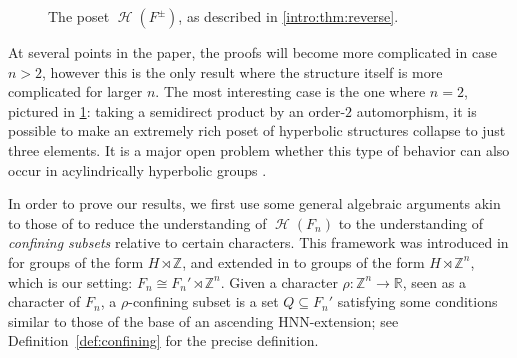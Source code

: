 \documentclass[reqno,12pt]{amsart}\setcounter{tocdepth}{1}
\theoremstyle{definition}
\newcommand{\Z}{\mathbb{Z}}
\newcommand{\R}{\mathbb{R}}
\DeclareMathOperator{\Hyp}{\mathcal{H}}
\numberwithin{equation}{section}
\begin{document}
\begin{figure}[htb]
\centering
{}

\caption{The poset $\Hyp(F^{\pm})$, as described in \cref{intro:thm:reverse}.}
\label{intro:fig:reverse}
\end{figure}

At several points in the paper, the proofs will become more complicated in case $n > 2$, however this is the only result where the structure itself is more complicated for larger $n$. The most interesting case is the one where $n = 2$, pictured in \cref{intro:fig:reverse}: taking a semidirect product by an order-$2$ automorphism, it is possible to make an extremely rich poset of hyperbolic structures collapse to just three elements. It is a major open problem whether this type of behavior can also occur in acylindrically hyperbolic groups \cite[Question 2]{erratum}.

\medskip

In order to prove our results, we first use some general algebraic arguments akin to those of \cite{ABO, confining, NL} to reduce the understanding of $\Hyp(F_n)$ to the understanding of \emph{confining subsets} relative to certain characters. This framework was introduced in \cite{caprace15} for groups of the form $H \rtimes \Z$, and extended in \cite{confining} to groups of the form $H \rtimes \Z^n$, which is our setting: $F_n \cong F_n' \rtimes \Z^n$. Given a character $\rho \colon \Z^n \to \R$, seen as a character of $F_n$, a $\rho$-confining subset is a set $Q \subseteq F_n'$ satisfying some conditions similar to those of the base of an ascending HNN-extension; see Definition~\ref{def:confining} for the precise definition.
\end{document}
